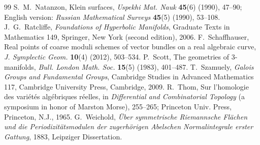\begin{thebibliography}{99}
 S.~M.~Natanzon, Klein surfaces, \emph{Uspekhi Mat. Nauk}
\textbf{45}(6) (1990), 47--90; English version: \emph{Russian Mathematical Surveys}
\textbf{45}(5) (1990), 53--108.
 J.~G.~Ratcliffe, \emph{Foundations of Hyperbolic Manifolds}, Graduate
Texts in Mathematics 149, Springer, New York (second edition), 2006.
 F.~Schaffhauser, Real points of coarse moduli schemes of vector
bundles on a real algebraic curve, \emph{J. Symplectic Geom.} \textbf{10}(4) (2012),
503--534.
 P.~Scott, The geometries of 3-manifolds, \emph{Bull. London Math. Soc.}
\textbf{15}(5) (1983), 401--487.
 T.~Szamuely, \emph{Galois Groups and Fundamental Groups}, Cambridge
Studies in Advanced Mathematics 117, Cambridge University Press, Cambridge, 2009.
 R.~Thom, Sur l'homologie des variétés algébriques réelles, in
\emph{Differential and Combinatorial Topology} (a symposium in honor of Marston Morse),
255--265; Princeton Univ. Press, Princeton, N.J., 1965.
 G.~Weichold, \emph{Über symmetrische Riemannsche Flächen und die
Periodizitätsmodulen der zugerhörigen Abelschen Normalintegrale erster Gattung}, 1883,
Leipziger Dissertation.
\end{thebibliography}

